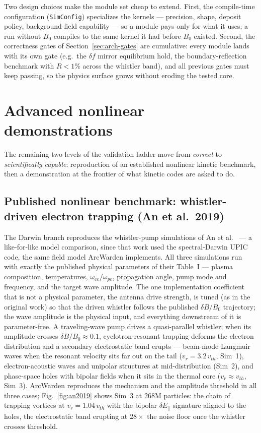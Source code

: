 \documentclass[11pt]{article}
\newcommand{\arcw}{ArcWarden}
\begin{document}
Two design choices make the module set cheap to extend. First, the
compile-time configuration (\texttt{SimConfig}) specializes the kernels
--- precision, shape, deposit policy, background-field capability ---
so a module pays only for what it uses; a run without $B_0$ compiles to
the same kernel it had before $B_0$ existed. Second, the correctness
gates of Section~\ref{sec:arch-gates} are cumulative: every module
lands with its own gate (e.g.\ the $\delta f$ mirror equilibrium hold,
the boundary-reflection benchmark with $R<1\%$ across the whistler
band), and all previous gates must keep passing, so the physics surface
grows without eroding the tested core.

\section{Advanced nonlinear demonstrations}
\label{sec:demos}

The remaining two levels of the validation ladder move from
\emph{correct} to \emph{scientifically capable}: reproduction of an
established nonlinear kinetic benchmark, then a demonstration at the
frontier of what kinetic codes are asked to do.

\subsection{Published nonlinear benchmark: whistler-driven electron
trapping (An et al.\ 2019)}
\label{sec:demo-an}
The Darwin branch reproduces the whistler-pump simulations of An et
al.~\cite{an2019} --- a like-for-like model comparison, since that work
used the spectral-Darwin UPIC code, the same field model \arcw{}
implements. All three simulations run with exactly the published
physical parameters of their Table~I --- plasma composition,
temperatures, $\omega_{ce}/\omega_{pe}$, propagation angle, pump mode
and frequency, and the target wave amplitude. The one implementation
coefficient that is not a physical parameter, the antenna drive
strength, is tuned (as in the original work) so that the driven
whistler follows the published $\delta B/B_0$ trajectory; the wave
amplitude is the physical input, and everything downstream of it is
parameter-free. A traveling-wave pump
drives a quasi-parallel whistler; when its amplitude crosses
$\delta B/B_0\approx0.1$, cyclotron-resonant trapping deforms the
electron distribution and a secondary electrostatic band erupts ---
beam-mode Langmuir waves when the resonant velocity sits far out on the
tail ($v_r=3.2\,v_{th}$, Sim~1), electron-acoustic waves and unipolar
structures at mid-distribution (Sim~2), and phase-space holes with
bipolar fields when it sits in the thermal core ($v_r\approx v_{th}$,
Sim~3). \arcw{} reproduces the mechanism and the amplitude threshold in
all three cases; Fig.~\ref{fig:an2019} shows Sim~3 at 268M particles:
the chain of trapping vortices at $v_r=1.04\,v_{th}$ with the bipolar
$\delta E_\parallel$ signature aligned to the holes, the electrostatic
band erupting at $28\times$ the noise floor once the whistler crosses
threshold.
\end{document}
